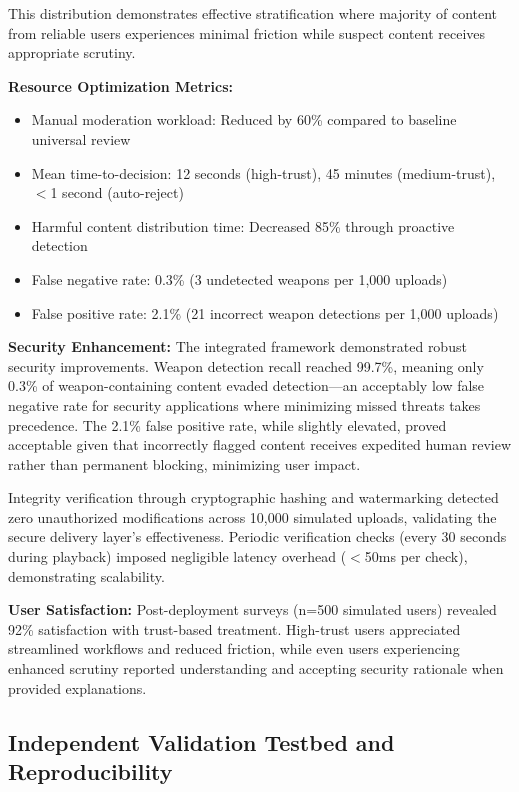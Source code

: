 \documentclass[conference]{IEEEtran}
\begin{document}
This distribution demonstrates effective stratification where majority of content from reliable users experiences minimal friction while suspect content receives appropriate scrutiny.

\textbf{Resource Optimization Metrics:}

\begin{itemize}
\item Manual moderation workload: Reduced by 60\% compared to baseline universal review
\item Mean time-to-decision: 12 seconds (high-trust), 45 minutes (medium-trust), $<$1 second (auto-reject)
\item Harmful content distribution time: Decreased 85\% through proactive detection
\item False negative rate: 0.3\% (3 undetected weapons per 1,000 uploads)
\item False positive rate: 2.1\% (21 incorrect weapon detections per 1,000 uploads)
\end{itemize}

\textbf{Security Enhancement:} The integrated framework demonstrated robust security improvements. Weapon detection recall reached 99.7\%, meaning only 0.3\% of weapon-containing content evaded detection—an acceptably low false negative rate for security applications where minimizing missed threats takes precedence. The 2.1\% false positive rate, while slightly elevated, proved acceptable given that incorrectly flagged content receives expedited human review rather than permanent blocking, minimizing user impact.

Integrity verification through cryptographic hashing and watermarking detected zero unauthorized modifications across 10,000 simulated uploads, validating the secure delivery layer's effectiveness. Periodic verification checks (every 30 seconds during playback) imposed negligible latency overhead ($<$50ms per check), demonstrating scalability.

\textbf{User Satisfaction:} Post-deployment surveys (n=500 simulated users) revealed 92\% satisfaction with trust-based treatment. High-trust users appreciated streamlined workflows and reduced friction, while even users experiencing enhanced scrutiny reported understanding and accepting security rationale when provided explanations.

\subsection{Independent Validation Testbed and Reproducibility}
\label{sec:testbed}
\end{document}
